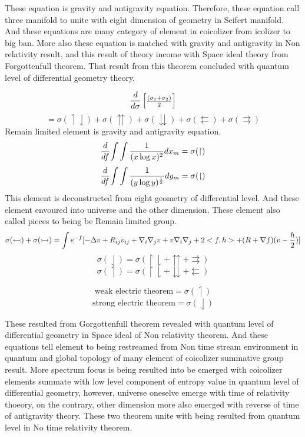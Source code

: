\documentclass{jsarticle}
\begin{document}
{  These equation is gravity and antigravity equation. 
  Therefore, these equation call three manifold to unite with eight dimension
  of geometry in Seifert manifold.
  And these equations are many category of element in coicolizer from
	   icolizer to big ban. More also these equation is matched with
	   gravity and antigravity in Non relativity result,
	   and this result of theory income with Space ideal theory from
	   Forgottenfull theorem.
	   That result from this theorem concluded with quantum level of
	   differential geometry theory.

	   $$ {d \over d\sigma}\begin{bmatrix}{(\sigma_1 + \sigma_2) 
	   \over 2}\end{bmatrix}  $$
	   $$ = \sigma(\upharpoonleft \downharpoonleft) + \sigma(
	   \upuparrows)+ \sigma(\downdownarrows)+ 
	   \sigma(\leftleftarrows)
	   + \sigma(\rightrightarrows) $$
	   Remain limited element is gravity and antigravity equation.
	   $$ {d \over df}{\int \int {1 \over (x \log x)^2}}dx_m
	   = \sigma(\upharpoonright) $$
	   $$ {d \over df}{\int \int {1 \over (y \log y)^{1 \over2}}}dy_m
	   = \sigma(\downharpoonright) $$
	   This element is deconstructed from eight geometry of differential
	   level. And these element envoured into universe and the other
	   dimension. These element also called pieces to being be Remain
	   limited group.
	   $$ \sigma(\leftarrowtail) + \sigma(\rightarrowtail)
	   = \int e^{-f}[-\Delta v + R_{ij}v_{ij} + \nabla_{i}\nabla_{j}v
	   + v\nabla_{i}\nabla_{j} + 2 <f,h> + (R + \nabla f)(v - 
	   {h \over 2})]
	   $$
	   $$ \sigma(\downharpoonleft) = \sigma(\upharpoonright 
	   \downharpoonright + \upuparrows 
	   + \rightrightarrows)$$
	   $$ \sigma(\upharpoonleft) =  \sigma(\upharpoonright 
	   \downharpoonright + \downdownarrows 
	   + \leftleftarrows) $$
         
	   $$ \text{weak electric theorem} = \sigma(\upharpoonleft) $$
	   $$ \text{strong electric theorem} = \sigma(\downharpoonleft) $$

	   These resulted from Gorgottenfull theorem revealed with
	   quantum level of differential geometry in Space ideal of
	   Non relativity theorem.
	   And these equations tell element to being restreamed from
	   Non time stream environment in quantum and global topology 
	   of many element of coicolizer summative group result.
	   More spectrum focus is being resulted into be emerged with
	   coicolizer elements summate with low level component of
           entropy value in quantum level of differential geometry,
	   however, universe oneselve emerge with time of relativity thoeory,
	   on the contrary, other dimension more also emerged with reverse
	   of time of antigravity theory.
	   These two theorem unite with being resulted from quantum level
	   in No time relativity theorem.


}
\end{document}
